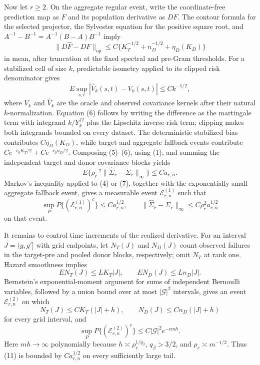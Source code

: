 Now let \(r\ge2\). On the aggregate regular event, write the coordinate-free prediction map as \(F\) and its population derivative as \(DF\). The contour formula for the selected projector, the Sylvester equation for the positive square root, and
\(A^{-1}-B^{-1}=A^{-1}(B-A)B^{-1}\) imply
\[
 \|D\widehat F-DF\|_{\mathrm{op}}
 \le C\{K_T^{-1/2}+n_D^{-1/2}+\eta_D(K_D)\}              \tag{5}
\]
in mean, after truncation at the fixed spectral and pre-Gram thresholds. For a stabilized cell of size \(k\), predictable isometry applied to its clipped risk denominator gives
\[
 E\sup_{s,t}\left|\widehat V_k(s,t)-V_k(s,t)\right|
 \le Ck^{-1/2},                                           \tag{6}
\]
where \(V_k\) and \(\widehat V_k\) are the oracle and observed covariance kernels after their natural \(k\)-normalization. Equation (6) follows by writing the difference as the martingale term with integrand \(k/Y_k^{\dagger 2}\) plus the Lipschitz inverse-risk term; clipping makes both integrands bounded on every dataset. The deterministic stabilized bias contributes \(C\eta_D(K_D)\), while target and aggregate fallback events contribute \(Ce^{-c_0K_T/2}+Ce^{-c_0n_D/2}\). Composing (5)--(6), using (1), and summing the independent target and donor covariance blocks yields
\[
 E\{\rho_r^{-2}\|\widehat\Sigma_r-\Sigma_r\|_\infty\}
 \le Ca_{r,n}.                                            \tag{7}
\]
Markov's inequality applied to (4) or (7), together with the exponentially small aggregate fallback event, gives a measurable event \(\mathcal E_{r,n}^{(1)}\) such that
\[
 \sup_PP\{(\mathcal E_{r,n}^{(1)})^c\}\le Ca_{r,n}^{1/2},
 \qquad
 \|\widehat\Sigma_r-\Sigma_r\|_\infty
 \le C\rho_r^2a_{r,n}^{1/2}                              \tag{8}
\]
on that event.

It remains to control time increments of the realized derivative. For an interval \(J=(g,g']\) with grid endpoints, let \(N_T(J)\) and \(N_D(J)\) count observed failures in the target-pre and pooled donor blocks, respectively; omit \(N_T\) at rank one. Hazard smoothness implies
\[
 EN_T(J)\le LK_T|J|,
 \qquad EN_D(J)\le Ln_D|J|.                               \tag{9}
\]
Bernstein's exponential-moment argument for sums of independent Bernoulli variables, followed by a union bound over at most \(|\mathcal G|^2\) intervals, gives an event \(\mathcal E_{r,n}^{(2)}\) on which
\[
 N_T(J)\le C K_T(|J|+h),
 \qquad N_D(J)\le C n_D(|J|+h)                            \tag{10}
\]
for every grid interval, and
\[
 \sup_PP\{(\mathcal E_{r,n}^{(2)})^c\}
 \le C|\mathcal G|^2e^{-cmh}.                             \tag{11}
\]
Here \(mh\to\infty\) polynomially because \(h\asymp\rho_r^{1/q_\beta}\), \(q_\beta>3/2\), and \(\rho_r\asymp m^{-1/2}\). Thus (11) is bounded by \(Ca_{r,n}^{1/2}\) on every sufficiently large tail.

